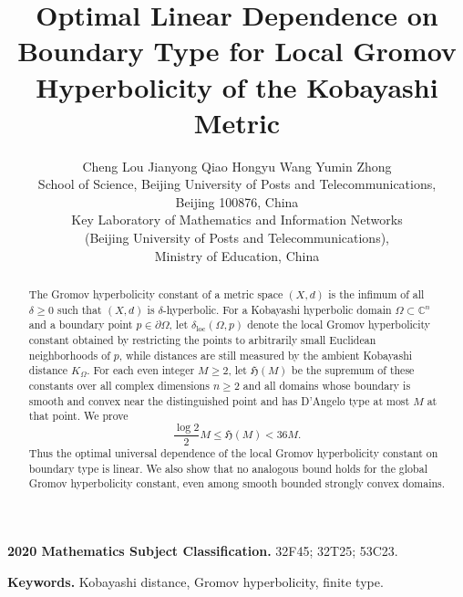 \documentclass[11pt]{article}
\theoremstyle{definition}
\newcommand{\C}{\mathbb{C}}
\begin{document}
\title{Optimal Linear Dependence on Boundary Type for Local Gromov
	Hyperbolicity of the Kobayashi Metric}

\author{%
  \parbox{\dimexpr\textwidth-2\tabcolsep\relax}{\centering
    Cheng Lou \quad Jianyong Qiao \quad Hongyu Wang \quad Yumin Zhong
    \\[1.2ex]
    {\small
      School of Science, Beijing University of Posts and Telecommunications,\\
      Beijing 100876, China\\
      Key Laboratory of Mathematics and Information Networks\\
      (Beijing University of Posts and Telecommunications),\\
      Ministry of Education, China\endgraf}
  }%
}

\date{}

\maketitle
\begin{abstract}


The Gromov hyperbolicity constant of a metric space \((X,d)\) is the infimum of all \(\delta\ge0\) such that \((X,d)\) is \(\delta\)-hyperbolic. For a Kobayashi hyperbolic domain \(\Omega\subset\C^n\) and a
boundary point \(p\in\partial\Omega\), let
\(\delta_{\mathrm{loc}}(\Omega,p)\) denote the local Gromov
hyperbolicity constant obtained by restricting the points to arbitrarily
small Euclidean neighborhoods of \(p\), while distances are still
measured by the ambient Kobayashi distance \(K_\Omega\).  For
each even integer \(M\ge2\), let \(\mathfrak H(M)\) be the supremum of these
constants over all complex dimensions \(n\ge2\) and all domains whose
boundary is smooth and convex near the distinguished point and has D'Angelo type
at most \(M\) at that point.  We prove
\[
\frac{\log 2}{2} M
\le
\mathfrak H(M)
<
36M.
\]
 Thus the optimal universal dependence of the local
Gromov hyperbolicity constant on boundary type is linear.  We also show that
no analogous bound holds for the global Gromov hyperbolicity constant,
even among smooth bounded strongly convex domains.

\end{abstract}

\noindent\textbf{2020 Mathematics Subject Classification.}
 32F45; 32T25; 53C23.

\medskip
\noindent\textbf{Keywords.}
Kobayashi distance,  Gromov hyperbolicity,  finite type.
\setcounter{tocdepth}{2}
\tableofcontents
\end{document}
